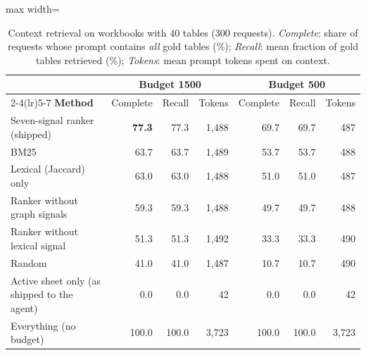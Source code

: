 \begin{table}
\caption{Context retrieval on workbooks with 40 tables (300 requests). \emph{Complete}: share of requests whose prompt contains \emph{all} gold tables (\%); \emph{Recall}: mean fraction of gold tables retrieved (\%); \emph{Tokens}: mean prompt tokens spent on context.}
\label{tab:e2}

\centering\footnotesize
\begin{adjustbox}{max width=\columnwidth}\begin{tabular}{l rrr rrr}
\toprule
& \multicolumn{3}{c}{\textbf{Budget 1500}} & \multicolumn{3}{c}{\textbf{Budget 500}} \\
\cmidrule(lr){2-4}\cmidrule(lr){5-7}
\textbf{Method} & Complete & Recall & Tokens & Complete & Recall & Tokens \\
\midrule
Seven-signal ranker (shipped) & \textbf{77.3} & 77.3 & 1{,}488 & 69.7 & 69.7 & 487 \\
BM25 & 63.7 & 63.7 & 1{,}489 & 53.7 & 53.7 & 488 \\
Lexical (Jaccard) only & 63.0 & 63.0 & 1{,}488 & 51.0 & 51.0 & 487 \\
Ranker without graph signals & 59.3 & 59.3 & 1{,}488 & 49.7 & 49.7 & 488 \\
Ranker without lexical signal & 51.3 & 51.3 & 1{,}492 & 33.3 & 33.3 & 490 \\
Random & 41.0 & 41.0 & 1{,}487 & 10.7 & 10.7 & 490 \\
Active sheet only (as shipped to the agent) & 0.0 & 0.0 & 42 & 0.0 & 0.0 & 42 \\
Everything (no budget) & 100.0 & 100.0 & 3{,}723 & 100.0 & 100.0 & 3{,}723 \\
\bottomrule
\end{tabular}\end{adjustbox}
\end{table}
